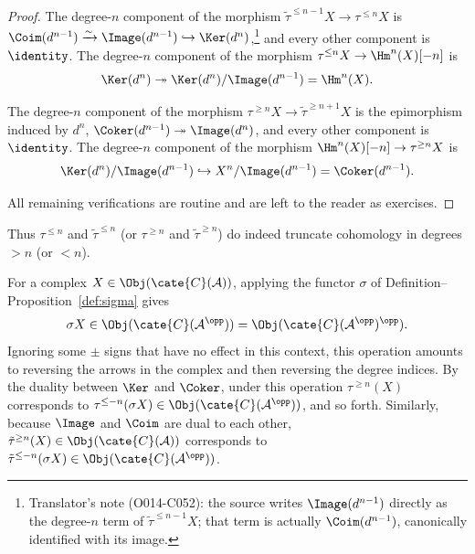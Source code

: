 \begin{proof}
	The degree-$n$ component of the morphism
	$\tilde{\tau}^{\leq n-1} X \to \tau^{\leq n} X$ is
	$\Coim(d^{n-1}) \xrightarrow{\sim}
	\Image(d^{n-1}) \hookrightarrow \Ker(d^n)$,\footnote{Translator's note
	(O014-C052): the source writes $\Image(d^{n-1})$ directly as the
	degree-$n$ term of $\tilde{\tau}^{\leq n-1}X$; that term is actually
	$\Coim(d^{n-1})$, canonically identified with its image.}
	and every other component is $\identity$. The degree-$n$ component of the
	morphism $\tau^{\leq n} X \to \Hm^n(X)[-n]$ is
	\[ \Ker(d^n) \twoheadrightarrow \Ker(d^n)/\Image(d^{n-1}) = \Hm^n(X). \]

	The degree-$n$ component of the morphism
	$\tau^{\geq n} X \to \tilde{\tau}^{\geq n+1} X$ is the epimorphism
	induced by $d^n$, $\Coker(d^{n-1}) \twoheadrightarrow \Image(d^n)$, and
	every other component is $\identity$. The degree-$n$ component of the
	morphism $\Hm^n(X)[-n] \to \tau^{\geq n} X$ is
	\[ \Ker(d^n)/\Image(d^{n-1}) \hookrightarrow X^n/\Image(d^{n-1}) = \Coker(d^{n-1}). \]

	All remaining verifications are routine and are left to the reader as
	exercises.
\end{proof}

Thus $\tau^{\leq n}$ and $\tilde{\tau}^{\leq n}$ (or $\tau^{\geq n}$ and
$\tilde{\tau}^{\geq n}$) do indeed truncate cohomology in degrees $>n$
(or $<n$).

\begin{remark}\label{rem:truncation-sigma}
	For a complex $X \in \Obj(\cate{C}(\mathcal{A}))$, applying the functor
	$\sigma$ of Definition--Proposition~\ref{def:sigma} gives
	\[
	\sigma X \in \Obj(\cate{C}(\mathcal{A}^{\opp})) =
	\Obj(\cate{C}(\mathcal{A}^{\opp})^{\opp}).
	\]
	Ignoring some $\pm$ signs that have no effect in this context, this
	operation amounts to reversing the arrows in the complex and then
	reversing the degree indices. By the duality between $\Ker$ and $\Coker$,
	under this operation $\tau^{\geq n}(X)$ corresponds to
	$\tau^{\leq -n}(\sigma X) \in
	\Obj(\cate{C}(\mathcal{A}^{\opp}))$, and so forth. Similarly, because
	$\Image$ and $\Coim$ are dual to each other,
	$\tilde{\tau}^{\geq n}(X) \in \Obj(\cate{C}(\mathcal{A}))$ corresponds
	to $\tilde{\tau}^{\leq -n}(\sigma X) \in
	\Obj(\cate{C}(\mathcal{A}^{\opp}))$.
\end{remark}

